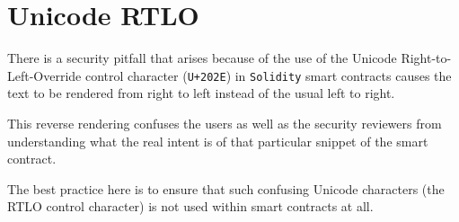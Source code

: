 \section{Unicode RTLO}\label{unicode-rtlo}

There is a security pitfall that arises because of the use of the
Unicode Right-to-Left-Override control character (\texttt{U+202E}) in
\texttt{Solidity} smart contracts causes the text to be rendered from
right to left instead of the usual left to right.

This reverse rendering confuses the users as well as the security
reviewers from understanding what the real intent is of that particular
snippet of the smart contract.

The best practice here is to ensure that such confusing Unicode
characters (the RTLO control character) is not used within smart
contracts at all.
